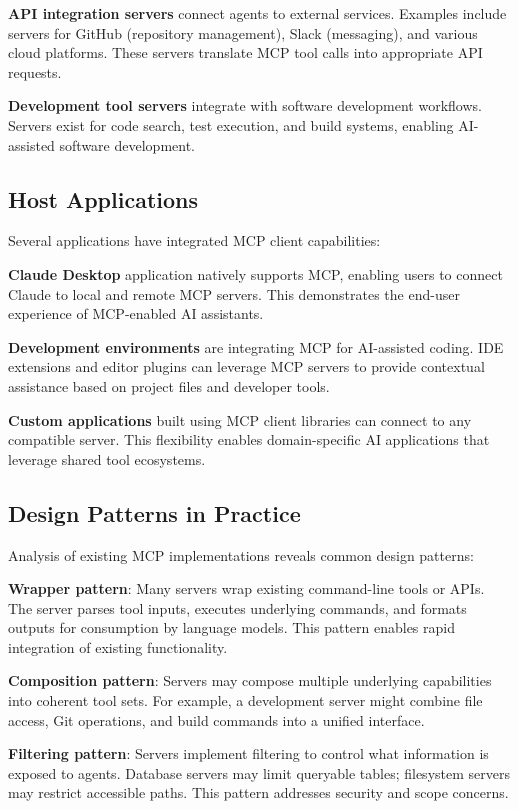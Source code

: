 \textbf{API integration servers} connect agents to external services. Examples include servers for GitHub (repository management), Slack (messaging), and various cloud platforms. These servers translate MCP tool calls into appropriate API requests.

\textbf{Development tool servers} integrate with software development workflows. Servers exist for code search, test execution, and build systems, enabling AI-assisted software development.

\subsection{Host Applications}

Several applications have integrated MCP client capabilities:

\textbf{Claude Desktop} application natively supports MCP, enabling users to connect Claude to local and remote MCP servers. This demonstrates the end-user experience of MCP-enabled AI assistants.

\textbf{Development environments} are integrating MCP for AI-assisted coding. IDE extensions and editor plugins can leverage MCP servers to provide contextual assistance based on project files and developer tools.

\textbf{Custom applications} built using MCP client libraries can connect to any compatible server. This flexibility enables domain-specific AI applications that leverage shared tool ecosystems.

\subsection{Design Patterns in Practice}

Analysis of existing MCP implementations reveals common design patterns:

\textbf{Wrapper pattern}: Many servers wrap existing command-line tools or APIs. The server parses tool inputs, executes underlying commands, and formats outputs for consumption by language models. This pattern enables rapid integration of existing functionality.

\textbf{Composition pattern}: Servers may compose multiple underlying capabilities into coherent tool sets. For example, a development server might combine file access, Git operations, and build commands into a unified interface.

\textbf{Filtering pattern}: Servers implement filtering to control what information is exposed to agents. Database servers may limit queryable tables; filesystem servers may restrict accessible paths. This pattern addresses security and scope concerns.

